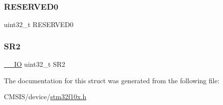 \mbox{\label{struct_f_s_m_c___bank2___type_def_af86c61a5d38a4fc9cef942a12744486b}} 
\subsubsection{\texorpdfstring{RESERVED0}{RESERVED0}}
{\footnotesize\ttfamily uint32\+\_\+t R\+E\+S\+E\+R\+V\+E\+D0}

\mbox{\label{struct_f_s_m_c___bank2___type_def_a89623ee198737b29dc0a803310605a83}} 
\subsubsection{\texorpdfstring{SR2}{SR2}}
{\footnotesize\ttfamily \mbox{\hyperlink{core__sc300_8h_aec43007d9998a0a0e01faede4133d6be}{\+\_\+\+\_\+\+IO}} uint32\+\_\+t S\+R2}



The documentation for this struct was generated from the following file\+:\begin{DoxyCompactItemize}
\item 
C\+M\+S\+I\+S/device/\mbox{\hyperlink{stm32f10x_8h}{stm32f10x.\+h}}\end{DoxyCompactItemize}
